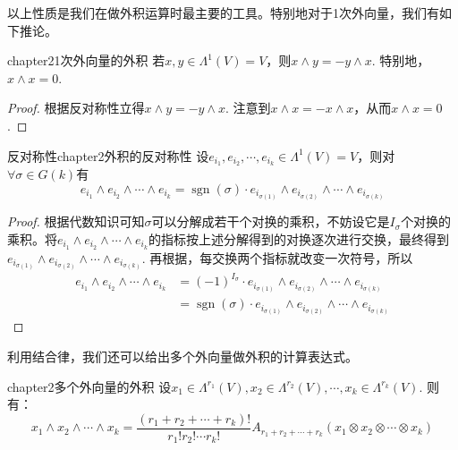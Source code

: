 以上性质是我们在做外积运算时最主要的工具。特别地对于1次外向量，我们有如下推论。
\begin{myprop}{}{chapter21次外向量的外积}
	若$x,y\in \Lambda^{1}(V)=V$，则$x\wedge y=-y\wedge x$. 特别地，$x\wedge x=0$.
\end{myprop}
\begin{proof}
根据反对称性立得$x\wedge y=-y\wedge x$. 注意到$x\wedge x=-x\wedge x$，从而$x\wedge x=0$.
\end{proof}

\begin{myprop}{反对称性}{chapter2外积的反对称性}
设$e_{i_{1}},e_{i_{2}},\cdots,e_{i_{k}}\in \Lambda^{1}(V)=V$，则对$\forall \sigma\in G(k)$有
\[
	e_{i_{1}}\wedge e_{i_{2}}\wedge \cdots\wedge e_{i_{k}}=\operatorname{sgn}(\sigma)\cdot e_{i_{\sigma(1)}}\wedge e_{i_{\sigma(2)}}\wedge \cdots\wedge e_{i_{\sigma(k)}}
\]
\end{myprop}
\begin{proof}
	根据代数知识可知$\sigma$可以分解成若干个对换的乘积，不妨设它是$I_{\sigma}$个对换的乘积。将$e_{i_{1}}\wedge e_{i_{2}}\wedge \cdots\wedge e_{i_{k}}$的指标按上述分解得到的对换逐次进行交换，最终得到$e_{i_{\sigma(1)}}\wedge e_{i_{\sigma(2)}}\wedge \cdots\wedge e_{i_{\sigma(k)}}$. 再根据，每交换两个指标就改变一次符号，所以
	\[
	\begin{split}
		e_{i_{1}}\wedge e_{i_{2}}\wedge \cdots\wedge e_{i_{k}}&=(-1)^{I_{\sigma}}\cdot e_{i_{\sigma(1)}}\wedge e_{i_{\sigma(2)}}\wedge \cdots\wedge e_{i_{\sigma(k)}}\\
		&=\operatorname{sgn}(\sigma)\cdot e_{i_{\sigma(1)}}\wedge e_{i_{\sigma(2)}}\wedge \cdots\wedge e_{i_{\sigma(k)}}
	\end{split}
	\]
\end{proof}

利用结合律，我们还可以给出多个外向量做外积的计算表达式。
\begin{myprop}{}{chapter2多个外向量的外积}
设$x_{1}\in \Lambda^{r_{1}}(V),x_{2}\in \Lambda^{r_{2}}(V),\cdots,x_{k}\in \Lambda^{r_{k}}(V)$. 则有：
\[
	x_{1}\wedge x_{2}\wedge\cdots\wedge x_{k}=\frac{(r_{1}+r_{2}+\cdots+r_{k})!}{r_{1}!r_{2}!\cdots r_{k}!}A_{r_{1}+r_{2}+\cdots+r_{k}}\left( x_{1}\otimes x_{2}\otimes\cdots\otimes x_{k}\right) 
\]
\end{myprop}


